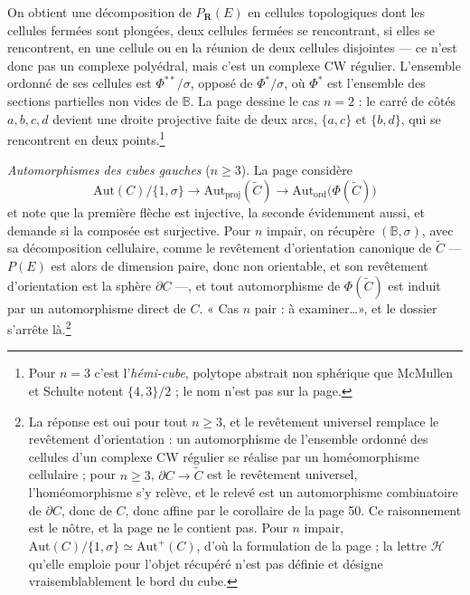 \documentclass[11pt,a4paper]{article}
\begin{document}
On obtient une décomposition de $P_{\mathbf{R}}(E)$ en cellules
topologiques dont les cellules fermées sont plongées, deux cellules fermées
se rencontrant, si elles se rencontrent, en une cellule ou en la réunion de
deux cellules disjointes --- ce n'est donc pas un complexe polyédral, mais
c'est un complexe CW régulier. L'ensemble ordonné de ses cellules est
$\Phi^{**}/\sigma$, opposé de $\Phi^*/\sigma$, où $\Phi^*$ est l'ensemble des
sections partielles non vides de $\mathbb{B}$. La page dessine le cas $n = 2$ :
le carré de côtés $a, b, c, d$ devient une droite projective faite de deux
arcs, $\{a, c\}$ et $\{b, d\}$, qui se rencontrent en deux points.\footnote{Pour
$n = 3$ c'est l'\emph{hémi-cube}, polytope abstrait non sphérique que
McMullen et Schulte notent $\{4,3\}/2$ ; le nom n'est pas sur la page.}

\emph{Automorphismes des cubes gauches} ($n \geqslant 3$). La page considère
\[
  \mathrm{Aut}(C)/\{1, \sigma\} \longrightarrow \mathrm{Aut}_{\mathrm{proj}}
  (\widetilde{C}) \longrightarrow \mathrm{Aut}_{\mathrm{ord}}
  \bigl(\Phi(\widetilde{C})\bigr)
\]
et note que la première flèche est injective, la seconde évidemment aussi,
et demande si la composée est surjective. Pour $n$ impair, on récupère
$(\mathbb{B}, \sigma)$, avec sa décomposition cellulaire, comme le revêtement
d'orientation canonique de $\widetilde{C}$ --- $P(E)$ est alors de dimension
paire, donc non orientable, et son revêtement d'orientation est la sphère
$\partial C$ ---, et tout automorphisme de $\Phi(\widetilde{C})$ est induit
par un automorphisme direct de $C$. « Cas $n$ pair : à examiner\ldots », et le
dossier s'arrête là.\footnote{La réponse est oui pour tout $n \geqslant 3$, et
le revêtement universel remplace le revêtement d'orientation : un
automorphisme de l'ensemble ordonné des cellules d'un complexe CW régulier se
réalise par un homéomorphisme cellulaire ; pour $n \geqslant 3$, $\partial C
\to \widetilde{C}$ est le revêtement universel, l'homéomorphisme s'y relève,
et le relevé est un automorphisme combinatoire de $\partial C$, donc de $C$,
donc affine par le corollaire de la page 50. Ce raisonnement est le nôtre, et
la page ne le contient pas. Pour $n$ impair, $\mathrm{Aut}(C)/\{1, \sigma\}
\simeq \mathrm{Aut}^+(C)$, d'où la formulation de la page ; la lettre
$\mathcal{H}$ qu'elle emploie pour l'objet récupéré n'est pas définie et
désigne vraisemblablement le bord du cube.}
\end{document}

